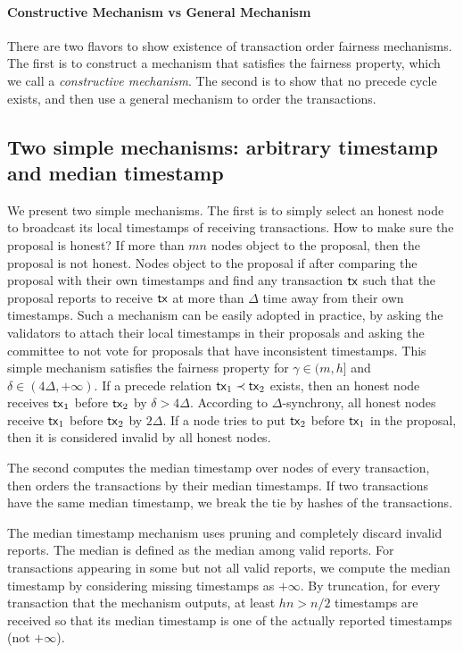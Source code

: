 \documentclass[runningheads]{llncs}
\begin{document}
\paragraph{Constructive Mechanism vs General Mechanism} There are two flavors to show existence of transaction order fairness mechanisms. The first is to construct a mechanism that satisfies the fairness property, which we call a \emph{constructive mechanism}. The second is to show that no precede cycle exists, and then use a general mechanism to order the transactions. 

\subsection{Two simple mechanisms: arbitrary timestamp and median timestamp}
We present two simple mechanisms. The first is to simply select an honest node to broadcast its local timestamps of receiving transactions. How to make sure the proposal is honest? If more than $mn$ nodes object to the proposal, then the proposal is not honest. Nodes object to the proposal if after comparing the proposal with their own timestamps and find any transaction $\mathsf{tx}$ such that the proposal reports to receive $\mathsf{tx}$ at more than $\Delta$ time away from their own timestamps. Such a mechanism can be easily adopted in practice, by asking the validators to attach their local timestamps in their proposals and asking the committee to not vote for proposals that have inconsistent timestamps. This simple mechanism satisfies the fairness property for $\gamma\in(m,h]$ and $\delta\in(4\Delta,+\infty)$. If a precede relation $\mathsf{tx}_1\prec \mathsf{tx}_2$ exists, then an honest node receives $\mathsf{tx}_1$ before $\mathsf{tx}_2$ by $\delta>4\Delta$. According to $\Delta$-synchrony, all honest nodes receive $\mathsf{tx}_1$ before $\mathsf{tx}_2$ by $2\Delta$. If a node tries to put $\mathsf{tx}_2$ before $\mathsf{tx}_1$ in the proposal, then it is considered invalid by all honest nodes. 

The second computes the median timestamp over nodes of every transaction, then orders the transactions by their median timestamps. If two transactions have the same median timestamp, we break the tie by hashes of the transactions. 

The median timestamp mechanism uses pruning and completely discard invalid reports. The median is defined as the median among valid reports. For transactions appearing in some but not all valid reports, we compute the median timestamp by considering missing timestamps as $+\infty$. By truncation, for every transaction that the mechanism outputs, at least $hn>n/2$ timestamps are received so that its median timestamp is one of the actually reported timestamps (not $+\infty$).  
\end{document}
